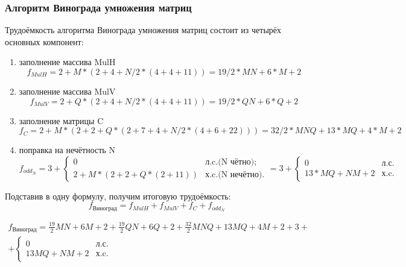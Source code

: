\subsubsection{Алгоритм Винограда умножения матриц}

\hspace{1.25cm}
Трудоёмкость алгоритма Винограда умножения матриц состоит из четырёх основных компонент:

\begin{enumerate}

\item заполнение массива MulH
\begin{equation}
f_{MulH} = 2 + M * (2 + 4 + N/2 * (4 + 4 + 11)) = 19/2 * MN + 6 * M + 2
\end{equation}

\item заполнение массива MulV
\begin{equation}
f_{MulV} = 2 + Q * (2 + 4 + N/2 * (4 + 4 + 11)) = 19/2 * QN + 6 * Q + 2
\end{equation}

\item заполнение матрицы C
\begin{equation}
f_C = 2 + M * (2 + 2 + Q * (2 + 7 + 4 + N/2 * (4 + 6 + 22))) = 32/2 * MNQ + 13 * MQ + 4 * M + 2
\end{equation}


\item поправка на нечётность N
\begin{equation}
f_{odd_N} = 3 + 
    \begin{cases}
      0 & \text{л.c.(N чётно)}; \\
      2 + M * (2 + 2 + Q * (2 + 11)) & \text{х.c.(N нечётно)}.
    \end{cases}
= 3 +
	\begin{cases}
      0 & \text{л.с.} \\
      13 * MQ + NM + 2 & \text{х.c.}
    \end{cases}
\end{equation}

\end{enumerate}

Подставив в одну формулу, получим итоговую трудоёмкость:
\[f_{\text{Виноград}} = f_{MulH} + f_{MulV} + f_C + f_{odd_N}\]

\begin{multline}
f_{\text{Виноград}} = \frac{19}{2} MN + 6M + 2 + \frac{19}{2} QN + 6Q + 2 + \frac{32}{2} MNQ + 13MQ + 4M + 2 + 3 + \\
+ \begin{cases}
0 & \text{л.с.} \\
13MQ + NM + 2 & \text{х.c.}
\end{cases}
\end{multline}

